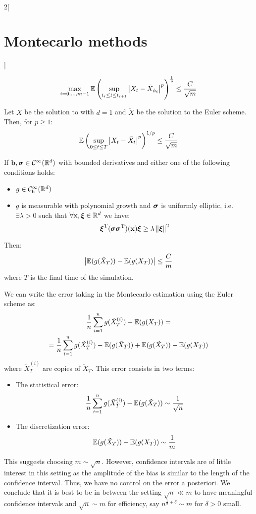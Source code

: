 \documentclass[../../../main_math.tex]{subfiles}
\begin{document}
\begin{multicols}{2}[\section{Montecarlo methods}]
\begin{lemma}
$$      \max_{i=0,\ldots,m-1}{\mathbb{E}\left(\sup_{t_i\leq t\leq t_{i+1}}\abs{X_t-\tilde{X}_{\phi_t}}^p\right)}^\frac{1}{p}\leq \frac{C}{\sqrt{m}}
    $$
  \end{lemma}
  \begin{theorem}
    Let $X$ be the solution to  with $d=1$ and $\tilde{X}$ be the solution to the Euler scheme. Then, for $p\geq 1$:
    $$
      {\mathbb{E}\left(\sup_{0\leq t\leq T}\abs{X_t-\tilde{X}_t}^p\right)}^{1/p}\leq \frac{C}{\sqrt{m}}
    $$
  \end{theorem}
  \begin{theorem}
    If $\boldsymbol{\mathrm{b}},\boldsymbol{\mathrm{\sigma}}\in \mathcal{C}^\infty(\mathbb{R}^d)$ with bounded derivatives and either one of the following conditions holds:
    \begin{itemize}
      \item $g\in \mathcal{C}^\infty_\text{b}(\mathbb{R}^d)$
      \item $g$ is measurable with polynomial growth and $\boldsymbol{\mathrm{\sigma}}$ is uniformly elliptic, i.e.\ $\exists\lambda>0$ such that $\forall \boldsymbol{\mathrm{x}},\boldsymbol{\mathrm{\xi}}\in\mathbb{R}^d$ we have:
            $$
              {\boldsymbol{\mathrm{\xi}}}^{\mathrm{T}}(\boldsymbol{\mathrm{\sigma}}{\boldsymbol{\mathrm{\sigma}}}^{\mathrm{T}})(\boldsymbol{\mathrm{x}})\boldsymbol{\mathrm{\xi}}\geq \lambda\left\|\boldsymbol{\mathrm{\xi}}\right\|^2
            $$
    \end{itemize}
    Then:
    $$
      \abs{\mathbb{E}(g(\tilde{X}_T))- \mathbb{E}(g(X_T))}\leq \frac{C}{m}
    $$
    where $T$ is the final time of the simulation.
  \end{theorem}
  \begin{remark}
    We can write the error taking in the Montecarlo estimation using the Euler scheme as:
    \begin{multline*}
      \frac{1}{n}\sum_{i=1}^n g(\tilde{X}_T^{(i)})-\mathbb{E}(g(X_T))=\\=\frac{1}{n}\sum_{i=1}^n g(\tilde{X}_T^{(i)})-\mathbb{E}(g(\tilde{X}_T))+\mathbb{E}(g(\tilde{X}_T))-\mathbb{E}(g(X_T))
    \end{multline*}
    where $\tilde{X}_T^{(i)}$ are \iid copies of $\tilde{X}_T$. This error consists in two terms:
    \begin{itemize}
      \item The statistical error: $$\frac{1}{n}\sum_{i=1}^n g(\tilde{X}_T^{(i)})-\mathbb{E}(g(\tilde{X}_T))\sim \frac{1}{\sqrt{n}}$$
      \item The discretization error:$$\mathbb{E}(g(\tilde{X}_T))-\mathbb{E}(g(X_T))\sim \frac{1}{m}$$
    \end{itemize}
    This suggests choosing $m\sim \sqrt{n}$. However, confidence intervals are of little interest in this setting as the amplitude of the bias is similar to the length of the confidence interval. Thus, we have no control on the error a posteriori. We conclude that it is best to be in between the setting $\sqrt{n}\ll m$ to have meaningful confidence intervals and $\sqrt{n}\sim m$ for efficiency, say $n^{\frac{1}{2}+\delta}\sim m$ for $\delta>0$ small.

\end{remark}
\end{multicols}
\end{document}
